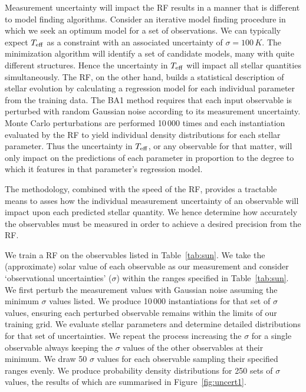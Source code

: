  
Measurement uncertainty will impact the RF results in a manner that is different to model finding algorithms. Consider an iterative model finding procedure in which we seek an  optimum model for a set of observations. We can typically expect $T_{\rm{eff}}$ as a constraint with an associated  uncertainty of $\sigma =100\,K$.  The minimization algorithm will identify a set of candidate models, many with quite different structures. Hence the uncertainty in $T_{\rm{eff}}$  will impact %
all stellar quantities simultaneously.  The  RF, on the other hand,
 builds a statistical description of stellar evolution by calculating a regression model for each individual parameter from the training data. 
 The BA1 method requires that each input observable is perturbed with random Gaussian noise according to its measurement uncertainty. Monte Carlo perturbations are performed 10\,000 times and each instantiation evaluated by the RF to yield individual density distributions for each stellar parameter. Thus the uncertainty in $T_{\rm{eff}}$, or any observable for that matter, will only impact on the predictions 
 of each parameter in proportion to the degree to which it features in that parameter's regression model.  

 
 The methodology, combined with the speed of the RF, provides a tractable means to 
 asses how the individual measurement uncertainty of an observable will impact upon each predicted stellar quantity. We hence determine  how accurately the observables must be measured in order to achieve a desired precision from the RF.
 
 
 
We train a RF on the observables listed in Table~\ref{tab:sun}.
We take the (approximate) solar value of each observable as our measurement and consider
`observational uncertainties' ($\sigma$) within the ranges specified in Table~\ref{tab:sun}. 
We first perturb the measurement values with Gaussian noise assuming the minimum $\sigma$ values listed. We produce 10\,000 instantiations for that set of $\sigma$ values, ensuring each perturbed observable remains within the limits of our training grid.
We evaluate stellar parameters and determine detailed distributions for that set of uncertainties. We repeat the process increasing the $\sigma$ for a single observable  always keeping the  $\sigma$ values of the other observables at their minimum. 
We draw 50 $\sigma$ values for each observable sampling their specified ranges evenly.  We produce  probability density distributions for 250 sets of $\sigma$ values, the results of which are summarised in Figure~\ref{fig:uncert1}.  


